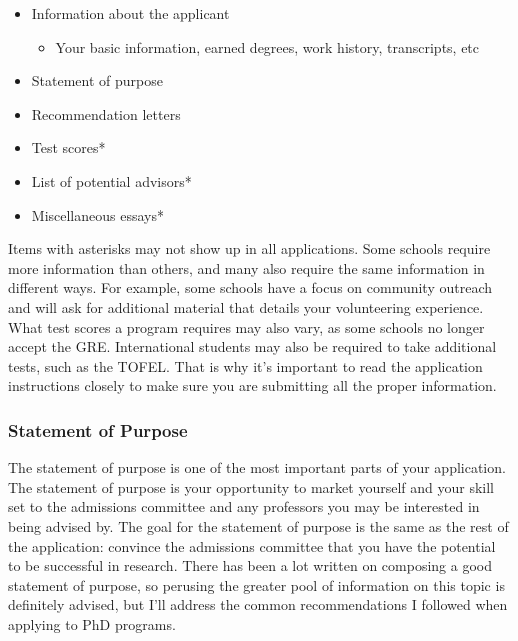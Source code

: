 \documentclass[12pt]{article}
\begin{document}
\begin{itemize}
    \item Information about the applicant
    \begin{itemize}
        \item Your basic information, earned degrees, work history, transcripts, etc 
    \end{itemize}
    \item Statement of purpose
    \item Recommendation letters
    \item Test scores*
    \item List of potential advisors*
    \item Miscellaneous essays*
\end{itemize}

Items with asterisks may not show up in all applications. Some schools require more information than others, and many also require the same information in different ways. For example, some schools have a focus on community outreach and will ask for additional material that details your volunteering experience. What test scores a program requires may also vary, as some schools no longer accept the GRE. International students may also be required to take additional tests, such as the TOFEL. That is why it's important to read the application instructions closely to make sure you are submitting all the proper information.

\subsubsection{Statement of Purpose}

The statement of purpose is one of the most important parts of your application. The statement of purpose is your opportunity to market yourself and your skill set to the admissions committee and any professors you may be interested in being advised by. The goal for the statement of purpose is the same as the rest of the application: convince the admissions committee that you have the potential to be successful in research. There has been a lot written on composing a good statement of purpose, so perusing the greater pool of information on this topic is definitely advised, but I'll address the common recommendations I followed when applying to PhD programs.
\end{document}
